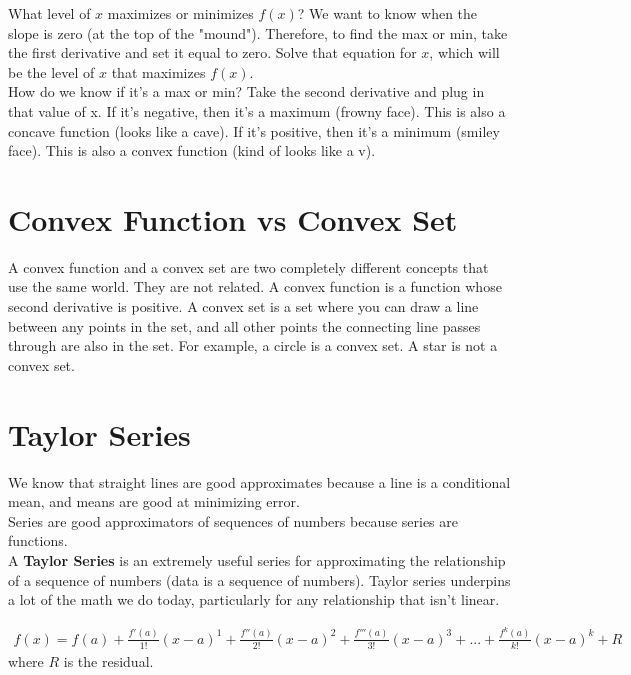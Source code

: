 \documentclass{article}
\begin{document}
What level of $x$ maximizes or minimizes $f(x)$? We want to know when the slope is zero (at the top of the "mound"). Therefore, to find the max or min, take the first derivative and set it equal to zero. Solve that equation for $x$, which will be the level of $x$ that maximizes $f(x)$. \\

How do we know if it's a max or min? Take the second derivative and plug in that value of x. If it's negative, then it's a maximum (frowny face). This is also a concave function (looks like a cave). If it's positive, then it's a minimum (smiley face). This is also a convex function (kind of looks like a v). 


\section{Convex Function vs Convex Set}
A convex function and a convex set are two completely different concepts that use the same world. They are not related. A convex function is a function whose second derivative is positive. A convex set is a set where you can draw a line between any points in the set, and all other points the connecting line passes through are also in the set. For example, a circle is a convex set. A star is not a convex set. 
 

\section{Taylor Series}

We know that straight lines are good approximates because a line is a conditional mean, and means are good at minimizing error.\\

Series are good approximators of sequences of numbers because series are functions. \\

A \textbf{Taylor Series} is an extremely useful series for approximating the relationship of a sequence of numbers (data is a sequence of numbers). Taylor series underpins a lot of the math we do today, particularly for any relationship that isn't linear. 

\begin{align}
    f(x) = f(a) + \frac{f'(a)}{1!}(x-a)^1 + \frac{f''(a)}{2!}(x-a)^2 + \frac{f'''(a)}{3!}(x-a)^3 + ... + \frac{f^k(a)}{k!}(x-a)^k + R
\end{align}
where $R$ is the residual.\\
\end{document}
